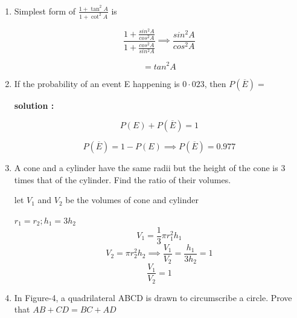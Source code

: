 \begin{enumerate}[label=\thesubsection.\arabic*, ref=\thesubsection.\theenumi]
\begin{center}
		
	\end{center}
	\solution
	
	$\angle {OAB}=\angle{OBA} = 40^{\circ}$ 
	
	$\angle {OBP}= 90^{\circ} \implies \angle{ABP}= 50^{\circ}$    
	
	\item Simplest form of $\frac{1+\tan^{2}A}{1+\cot^{2}A}$ is 
	
	\solution
	
	$$\frac{1 + \frac{sin^2A}{cos^2A}}{1+ \frac{cos^2A}{sin^2A}} \implies \frac{sin^2A}{cos^2A} $$
	
	$$= tan^2A$$
	
	\item If the probability of an event E happening is $0\cdot023$, then $P(\overline{E}) =$
	
	\textbf{solution :}
	
	$$P(E) + P(\overline{E})= 1$$
	
	$$P(\overline{E})= 1-P(E) \implies P(\overline{E})= 0.977$$
	
	\item A cone and a cylinder have the same radii but the height of the cone is 3 times that of the cylinder. Find the ratio of their volumes.
	
	\solution
	
	let $V_1$ and $V_2$ be the volumes of cone and cylinder 
	
	$r_1=r_2;h_1=3h_2 $ $$ V_1=\frac{1}{3}\pi r_1^2h_1 $$
	$$V_2= \pi r_2^2h_2 \implies \frac{V_1}{V_2} = \frac{h_1}{3h_2} = 1$$
	$$ \frac{V_1}{V_2}=1$$
	
	\item In Figure-4, a quadrilateral ABCD is drawn to circumscribe a circle. Prove that $AB + CD = BC + AD$
	

\end{enumerate}
